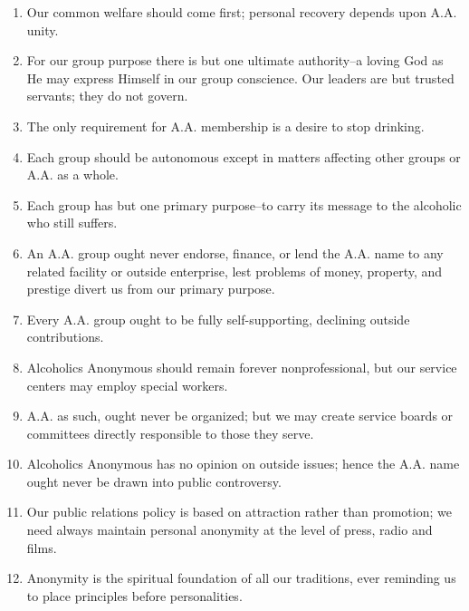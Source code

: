 \documentclass[11pt,twoside,letterpaper]{article}
\def\7pt{\fontsize{7}{8}\selectfont}
\begin{document}
\begin{minipage}[l][\dimexpr 0.485\textheight][t]{\dimexpr 0.485\textwidth}
\begin{minipage}[r][\dimexpr 0.485\textheight][t]{\dimexpr 0.525\textwidth}
      {\7pt
      \begin{enumerate}[leftmargin=4ex]
        \itemsep 0em
        \item Our common welfare should come first; personal recovery depends upon A.A. unity.
        \item For our group purpose there is but one ultimate authority--a loving God as He may express Himself in our group conscience. Our leaders are but trusted servants; they do not govern.
        \item The only requirement for A.A. membership is a desire to stop drinking.
        \item Each group should be autonomous except in matters affecting other groups or A.A. as a whole.
        \item Each group has but one primary purpose--to carry its message to the alcoholic who still suffers.
        \item An A.A. group ought never endorse, finance, or lend the A.A. name to any related facility or outside enterprise, lest problems of money, property, and prestige divert us from our primary purpose.
        \item Every A.A. group ought to be fully self-supporting, declining outside contributions.
        \item Alcoholics Anonymous should remain forever nonprofessional, but our service centers may employ special workers.
        \item A.A. as such, ought never be organized; but we may create service boards or committees directly responsible to those they serve.
        \item Alcoholics Anonymous has no opinion on outside issues; hence the A.A. name ought never be drawn into public controversy.
        \item Our public relations policy is based on attraction rather than promotion; we need always maintain personal anonymity at the level of press, radio and films.
        \item Anonymity is the spiritual foundation of all our traditions, ever reminding us to place principles before personalities.
      \end{enumerate}
      }
    \end{minipage}
  \end{minipage}
  \hfill
\end{document}

